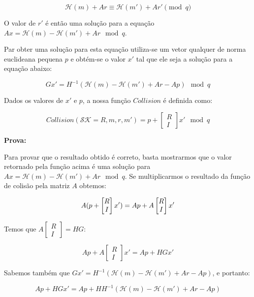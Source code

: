 \documentclass[a4paper]{article}
\begin{document}
    $$
    \mathcal{H}(m) + Ar  \equiv \mathcal{H}(m') + Ar' \pmod q
    $$
    
    O valor de $r'$ é então uma solução para a equação $Ax =
    \mathcal{H}(m) - \mathcal{H}(m') + Ar \mod q$.
    
    Par obter uma solução para esta equação utiliza-se um vetor qualquer
    de norma euclideana pequena $p$ e obtém-se o valor $x'$ tal que ele
    seja a solução para a equação abaixo:
    
    $$
    Gx' = H^{-1}(\mathcal{H}(m) - \mathcal{H}(m') + Ar - Ap) \mod q
    $$
    
    Dados os valores de $x'$ e $p$, a nossa função $Collision$ é definida
    como:
    
    $$ Collision(\mathcal{SK}=R, m, r, m') = p +
    \left[\begin{matrix}R\\I\end{matrix}\right]x' \mod q
    $$
    
    \textbf{Prova:}
    
    Para provar que o resultado obtido é correto, basta mostrarmos que o
    valor retornado pela função acima é uma solução para $Ax =
    \mathcal{H}(m) - \mathcal{H}(m') + Ar \mod q$. Se multiplicarmos o
    resultado da função de colisão pela matriz $A$ obtemos:
    
    $$ A(p+\left[\begin{matrix}R\\I\end{matrix}\right]x') = Ap +
    A\left[\begin{matrix}R\\I\end{matrix}\right]x'\\
    $$
    
    Temos que $A\left[\begin{matrix}R\\I\end{matrix}\right] = HG$:
    
    $$
    Ap + A\left[\begin{matrix}R\\I\end{matrix}\right]x' = Ap + HGx'
    $$
    
    Sabemos também que $Gx' = H^{-1}(\mathcal{H}(m) - \mathcal{H}(m') + Ar
    - Ap)$, e portanto:
    
    $$
    Ap + HGx' = Ap + H H^{-1}(\mathcal{H}(m) - \mathcal{H}(m') + Ar - Ap)
    $$
    
\end{document}
